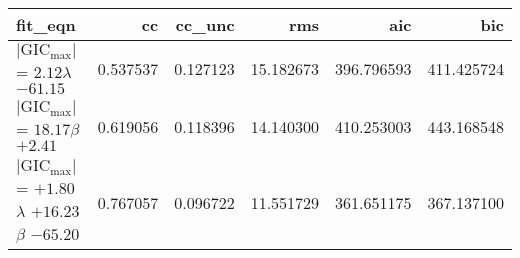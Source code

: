 \begin{tabular}{lrrrrr}
\toprule
fit_eqn & cc & cc_unc & rms & aic & bic \\
\midrule
$\vert{\text{GIC}_\text{max}}\vert$ = $2.12$$\lambda$ $-61.15$ & 0.537537 & 0.127123 & 15.182673 & 396.796593 & 411.425724 \\
$\vert{\text{GIC}_\text{max}}\vert$ = $18.17$$\beta$ $+2.41$ & 0.619056 & 0.118396 & 14.140300 & 410.253003 & 443.168548 \\
$\vert{\text{GIC}_\text{max}}\vert$ = $+1.80$$\lambda$ $+16.23$$\beta$ $-65.20$ & 0.767057 & 0.096722 & 11.551729 & 361.651175 & 367.137100 \\
\bottomrule
\end{tabular}
